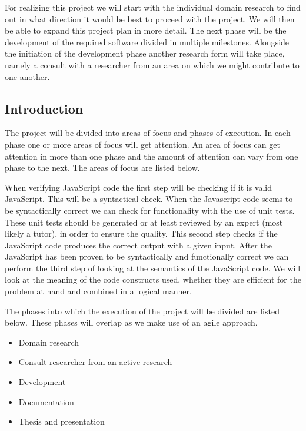 \documentclass{article}
\begin{document}

For realizing this project we will start with the individual domain research to
find out in what direction it would be best to proceed with the project. We
will then be able to expand this project plan in more detail. The next phase
will be the development of the required software divided in multiple
milestones. Alongside the initiation of the development phase another research
form will take place, namely a consult with a researcher from an area on which
we might contribute to one another.

\subsection{Introduction}


The project will be divided into areas of focus and phases of execution. In
each phase one or more areas of focus will get attention. An area of focus can
get attention in more than one phase and the amount of attention can vary from
one phase to the next. The areas of focus are listed below.

When verifying JavaScript code the first step will be checking if it is valid
JavaScript. This will be a syntactical check. When the Javascript code seems to
be syntactically correct we can check for functionality with the use of unit
tests. These unit tests should be generated or at least reviewed by an expert
(most likely a tutor), in order to ensure the quality. 
This second step checks if the JavaScript code produces the correct
output with a given input. After the JavaScript has been proven to be
syntactically and functionally correct we can perform the third step of looking
at the semantics of the JavaScript code. We will look at the meaning of the
code constructs used, whether they are efficient for the problem at hand and
combined in a logical manner.

The phases into which the execution of the project will be divided are listed
below. These phases will overlap as we make use of an agile approach.

\begin{itemize}
  \item Domain research
  \item Consult researcher from an active research
  \item Development
  \item Documentation
  \item Thesis and presentation
\end{itemize}
\end{document}
